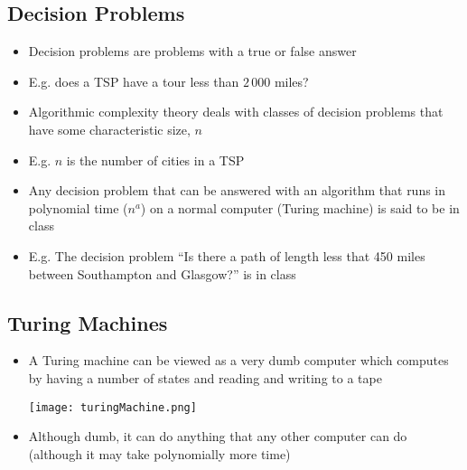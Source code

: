 
\begin{slide}
\section[-1]{Decision Problems}

\begin{PauseHighLight}
  \begin{itemize}\squeeze
  \item Decision problems are problems with a true or false answer\pause
  \item E.g. does a TSP have a tour less than $2\,000$ miles?\pause
  \item Algorithmic complexity theory deals with classes of decision problems
    that have some characteristic size, $n$\pause
  \item E.g. $n$ is the number of cities in a TSP\pause
  \item Any decision problem that can be answered with an algorithm that
    runs in polynomial time ($n^a$) on a normal computer (Turing
    machine) is said to be in class \pause
  \item E.g. The decision problem ``Is there a path of length less that
    450 miles between Southampton and Glasgow?'' is in class
    \pause
  \end{itemize}
\end{PauseHighLight}
\end{slide}


\begin{slide}
\section[-2]{Turing Machines}

\begin{PauseHighLight}
  \begin{itemize}
  \item  A Turing machine can be viewed as a very dumb computer which
    computes by having a number of states and reading and writing to a
    tape\pause
    \begin{center}
      \texttt{[image: turingMachine.png]}
    \end{center}
  \item Although dumb, it can do anything that any other computer can do
    (although it may take polynomially more time)\pause
  \end{itemize}
\end{PauseHighLight}

\end{slide}


